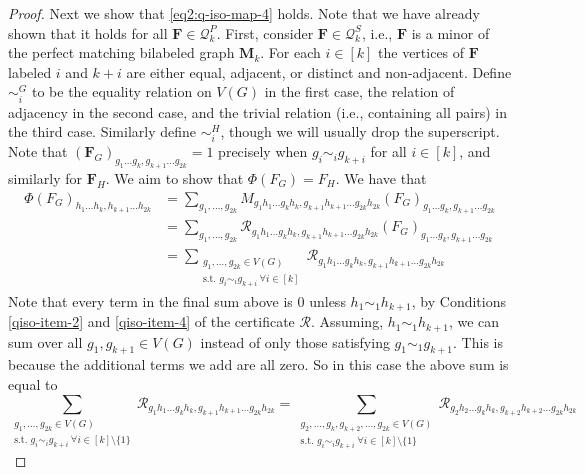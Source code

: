 \documentclass[11pt,a4paper]{article}
\theoremstyle{plain}
\theoremstyle{remark}
\theoremstyle{definition}
\begin{document}
\begin{proof}
    Next we show that \eqref{eq2:q-iso-map-4} holds. Note that we have already shown that it holds for all $\boldsymbol{F} \in \mathcal{Q}_k^P$. First, consider $\boldsymbol{F} \in \mathcal{Q}_k^S$, i.e., $\boldsymbol{F}$ is a minor of the perfect matching bilabeled graph $\boldsymbol{M}_k$. For each $i \in [k]$ the vertices of $\boldsymbol{F}$ labeled $i$ and $k+i$ are either equal, adjacent, or distinct and non-adjacent. Define $\sim^G_i$ to be the equality relation on $V(G)$ in the first case, the relation of adjacency in the second case, and the trivial relation (i.e., containing all pairs) in the third case. Similarly define $\sim_i^H$, though we will usually drop the superscript. Note that $(\boldsymbol{F}_G)_{g_1\ldots g_k,g_{k+1}\ldots g_{2k}} = 1$ precisely when $g_i \sim_i g_{k+i}$ for all $i \in [k]$, and similarly for $\boldsymbol{F}_H$. We aim to show that $\Phi(F_G) = F_H$. We have that
    \begin{align}
        \Phi(F_G)_{h_1\ldots h_k,h_{k+1}\ldots h_{2k}} &= \sum_{g_1, \ldots, g_{2k}} M_{g_1h_1\ldots g_kh_k,g_{k+1}h_{k+1}\ldots g_{2k}h_{2k}} (F_G)_{g_1\ldots g_k, g_{k+1}\ldots g_{2k}} \\
        &= \sum_{g_1, \ldots, g_{2k}} \mathcal{R}_{g_1h_1\ldots g_kh_k,g_{k+1}h_{k+1}\ldots g_{2k}h_{2k}} (F_G)_{g_1\ldots g_k, g_{k+1}\ldots g_{2k}}\\
        &= \sum_{\substack{g_1, \ldots, g_{2k} \in V(G) \\ \text{s.t. } g_i \sim_i g_{k+i} \ \forall i \in [k]}} \mathcal{R}_{g_1h_1\ldots g_kh_k,g_{k+1}h_{k+1}\ldots g_{2k}h_{2k}}
    \end{align}
Note that every term in the final sum above is 0 unless $h_1 \sim_1 h_{k+1}$, by Conditions \ref{qiso-item-2} and \ref{qiso-item-4} of the certificate $\mathcal{R}$. Assuming, $h_1 \sim_1 h_{k+1}$, we can sum over all $g_1, g_{k+1} \in V(G)$ instead of only those satisfying $g_1 \sim_1 g_{k+1}$. This is because the additional terms we add are all zero. So in this case the above sum is equal to
\begin{equation}
    \sum_{\substack{g_1, \ldots, g_{2k} \in V(G) \\ \text{s.t. } g_i \sim_i g_{k+i} \ \forall i \in [k]\setminus \{1\}}} \mathcal{R}_{g_1h_1\ldots g_kh_k,g_{k+1}h_{k+1}\ldots g_{2k}h_{2k}} = \sum_{\substack{g_2, \ldots, g_{k}, g_{k+2}, \ldots, g_{2k} \in V(G) \\ \text{s.t. } g_i \sim_i g_{k+i} \ \forall i \in [k]\setminus \{1\}}} \mathcal{R}_{g_2h_2\ldots g_kh_k,g_{k+2}h_{k+2}\ldots g_{2k}h_{2k}}

\end{equation}
\end{proof}
\end{document}
